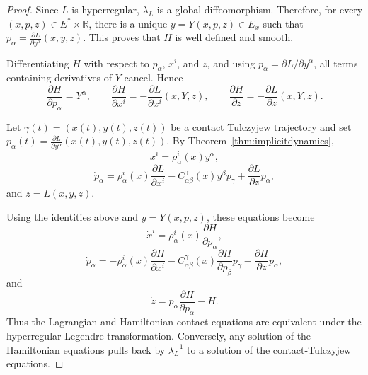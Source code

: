 \documentclass[10pt,a4paper]{amsart}
\newcommand{\R}{\mathbb{R}}
\begin{document}
\begin{proof}
Since \(L\) is hyperregular, \(\lambda_L\) is a global diffeomorphism. Therefore,
for every \((x,p,z)\in E^*\times\R\), there is a unique
\(y=Y(x,p,z)\in E_x\) such that $p_\alpha=\frac{\partial L}{\partial y^\alpha}(x,y,z)$.
This proves that \(H\) is well defined and smooth.

Differentiating \(H\) with respect to \(p_\alpha\), \(x^i\), and \(z\), and using
\(p_\alpha=\partial L/\partial y^\alpha\), all terms containing derivatives of
\(Y\) cancel. Hence
\[
\frac{\partial H}{\partial p_\alpha}=Y^\alpha,\qquad
\frac{\partial H}{\partial x^i}
=
-\frac{\partial L}{\partial x^i}(x,Y,z),
\qquad
\frac{\partial H}{\partial z}
=
-\frac{\partial L}{\partial z}(x,Y,z).
\]

Let \(\gamma(t)=(x(t),y(t),z(t))\) be a contact Tulczyjew trajectory and set
$p_\alpha(t)=\frac{\partial L}{\partial y^\alpha}(x(t),y(t),z(t))$. By Theorem~\ref{thm:implicitdynamics},
\[
\dot x^i=\rho^i_\alpha(x)y^\alpha,
\]
\[
\dot p_\alpha
=
\rho^i_\alpha(x)\frac{\partial L}{\partial x^i}
-
C^\gamma_{\alpha\beta}(x)y^\beta p_\gamma
+
\frac{\partial L}{\partial z}p_\alpha,
\]
and $\dot z=L(x,y,z)$.

Using the identities above and \(y=Y(x,p,z)\), these equations become
\[
\dot x^i
=
\rho^i_\alpha(x)\frac{\partial H}{\partial p_\alpha},
\]
\[
\dot p_\alpha
=
-\rho^i_\alpha(x)\frac{\partial H}{\partial x^i}
-
C^\gamma_{\alpha\beta}(x)
\frac{\partial H}{\partial p_\beta}p_\gamma
-
\frac{\partial H}{\partial z}p_\alpha,
\]
and
\[
\dot z
=
p_\alpha\frac{\partial H}{\partial p_\alpha}-H.
\]
Thus the Lagrangian and Hamiltonian contact equations are equivalent under
the hyperregular Legendre transformation. Conversely, any solution of the
Hamiltonian equations pulls back by \(\lambda_L^{-1}\) to a solution of the
contact-Tulczyjew equations.
\end{proof}
\end{document}
